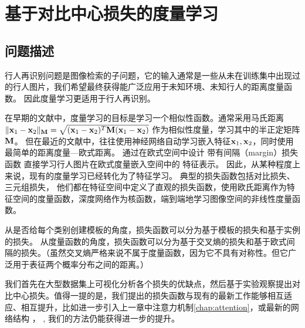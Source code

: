 


\chapter{基于对比中心损失的度量学习}

\section{问题描述}

行人再识别问题是图像检索的子问题，它的输入通常是一些从未在训练集中出现过的行人图片，我们希望最终获得能广泛应用于未知环境、未知行人的距离度量函数。
因此度量学习更适用于行人再识别。

在早期的文献中，度量学习的目标是学习一个相似性函数。通常采用马氏距离
$\Vert {\mathbf{x}}_1 - {\mathbf{x}}_2\Vert_{\mathbf{M}}=
	\sqrt{({\mathbf{x}}_1-{\mathbf{x}}_2)^T {\mathbf{M}} ({\mathbf{x}}_1 - {\mathbf{x}}_2) }$
作为相似性度量，学习其中的半正定矩阵${\mathbf{M}}$。
但在最近的文献中，往往使用神经网络自动学习嵌入特征${\mathbf{x}}_1, {\mathbf{x}}_2$，同时使用最简单的距离度量---欧式距离。
通过在欧式空间中设计
带有间隔（margin）损失函数
直接学习行人图片在欧式度量嵌入空间中的
特征表示。
因此，从某种程度上来说，现有的度量学习已经转化为了特征学习。
典型的损失函数包括对比损失、三元组损失，
他们都在特征空间中定义了直观的损失函数，使用欧氏距离作为特征空间的度量函数，深度网络作为核函数，端到端地学习图像空间的非线性度量函数。

从是否给每个类别创建模板的角度，损失函数可以分为基于模板的损失和基于实例的损失。
从度量函数的角度，损失函数可以分为基于交叉熵的损失和基于欧式间隔的损失。（虽然交叉熵严格来说不属于度量函数，因为它不具有对称性。但它广泛用于表征两个概率分布之间的距离。）

我们首先在大型数据集上可视化分析各个损失的优缺点，然后基于实验观察提出对比中心损失。值得一提的是，我们提出的损失函数与现有的最新工作能够相互适应、相互提升，比如进一步引入上一章中注意力机制\ref{chap:attention}，或最新的网络结构
\cite{szegedy2015going}，\cite{hu2017senet}
, 我们的方法仍能获得进一步的提升。

